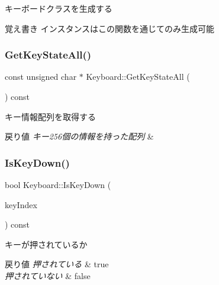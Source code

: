 キーボードクラスを生成する 

\begin{DoxyNote}{覚え書き}
インスタンスはこの関数を通じてのみ生成可能 
\end{DoxyNote}
\mbox{\label{class_keyboard_a630b88caceef0ad8962446079fa858e1}} 
\subsubsection{\texorpdfstring{Get\+Key\+State\+All()}{GetKeyStateAll()}}
{\footnotesize\ttfamily const unsigned char $\ast$ Keyboard\+::\+Get\+Key\+State\+All (\begin{DoxyParamCaption}{ }\end{DoxyParamCaption}) const}



キー情報配列を取得する 


\begin{DoxyRetVals}{戻り値}
{\em キー256個の情報を持った配列} & \\
\hline
\end{DoxyRetVals}
\mbox{\label{class_keyboard_ac9ac80ee73aa0b90d86ae7fba53906bd}} 
\subsubsection{\texorpdfstring{Is\+Key\+Down()}{IsKeyDown()}}
{\footnotesize\ttfamily bool Keyboard\+::\+Is\+Key\+Down (\begin{DoxyParamCaption}\item[{\mbox{\hyperlink{_keyboard_8h_a50f7749e42959062d6f7ee3df6a2fd93}{Virtual\+Key\+Index}}}]{key\+Index }\end{DoxyParamCaption}) const}



キーが押されているか 


\begin{DoxyRetVals}{戻り値}
{\em 押されている} & true \\
\hline
{\em 押されていない} & false \\
\hline
\end{DoxyRetVals}
\mbox{\label{class_keyboard_af305159262c399f1f4ca48590153d5a8}} 
